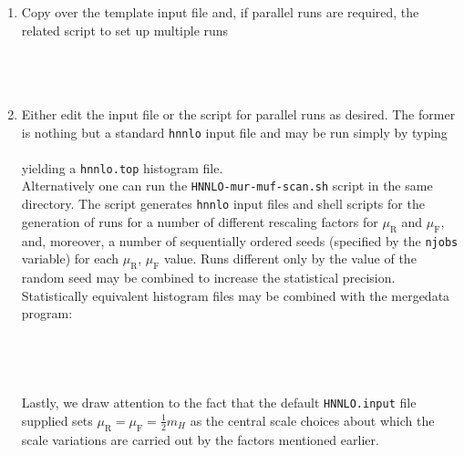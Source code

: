 \documentclass[11pt,a4paper]{article}
\newcommand{\noun}[1]{{\tt #1}}
\newcommand{\HNNLO}{\noun{hnnlo}}
\newcommand{\mur}{\mu_{\scriptscriptstyle \mathrm{R}}}
\newcommand{\muf}{\mu_{\scriptscriptstyle \mathrm{F}}}
\begin{document}
\begin{enumerate}
\item  Copy over the template input file and, if parallel runs are required,
the related script to set up multiple runs\\
\\
\\
\\

\item  Either edit the input file or the script for parallel runs as desired.
The former is nothing but a standard \HNNLO{} input file and may be
run simply by typing\\
\\ 
yielding a {\tt{hnnlo.top}} histogram file.
\vspace{3mm}\\
Alternatively one can run the {\tt{HNNLO-mur-muf-scan.sh}} script
in the same directory. The script generates \HNNLO{} input files
and shell scripts for the generation of runs for a number of different
rescaling factors for $\mur$ and
$\muf$, and, moreover, a number of sequentially ordered seeds (specified
by the {\tt{njobs}} variable) for each $\mur$, $\muf$ value.
Runs different only by the value of the random seed may be combined to increase
the statistical precision. Statistically equivalent histogram files may be
combined with the mergedata program:\\
\\
\\
\\
\vspace{3mm}\\
%
Lastly, we draw attention to the fact that the default
{\tt{HNNLO.input}} file supplied sets
$\mur=\muf={\frac{1}{2}}m{_{\scriptscriptstyle{H}}}$ as the central scale
choices about which the scale variations are carried out by the factors
mentioned earlier.


\end{enumerate}
\end{document}
